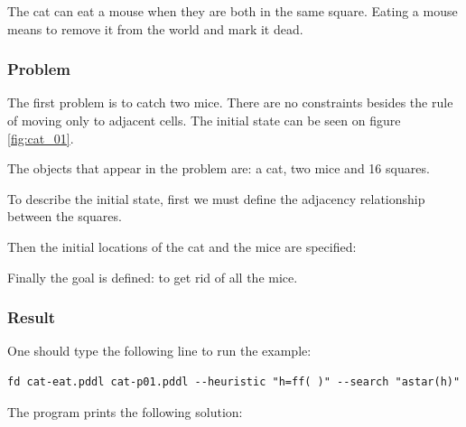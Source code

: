 

The cat can eat a mouse when they are both in the same square. Eating a mouse means to remove it from the world and mark it dead.




\subsubsection{Problem}

The first problem is to catch two mice. There are no constraints besides the rule of moving only to adjacent cells. The initial state can be seen on figure \ref{fig:cat_01}.

The objects that appear in the problem are: a cat, two mice and 16 squares.



To describe the initial state, first we must define the adjacency relationship between the squares.



Then the initial locations of the cat and the mice are specified:



Finally the goal is defined: to get rid of all the mice.




\subsubsection{Result}

One should type the following line to run the example: 

\begin{lstlisting}
fd cat-eat.pddl cat-p01.pddl --heuristic "h=ff( )" --search "astar(h)"
\end{lstlisting}

The program prints the following solution:



